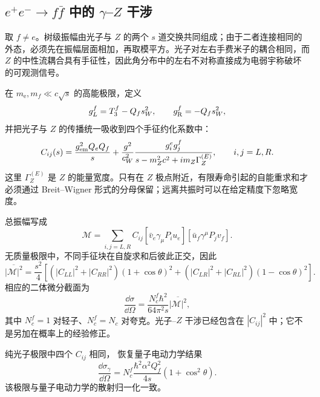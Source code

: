 


\subsection{$e^+e^-\to f\bar f$ 中的 $\gamma$--$Z$ 干涉}

取 $f\neq e$。树级振幅由光子与 $Z$ 的两个 $s$ 道交换共同组成；由于二者连接相同的外态，必须先在振幅层面相加，再取模平方。光子对左右手费米子的耦合相同，而 $Z$ 的中性流耦合具有手征性，因此角分布中的左右不对称直接成为电弱宇称破坏的可观测信号。

在 $m_{\mathrm e},m_f\ll c\sqrt s$ 的高能极限，定义
\begin{equation*}
g_L^f=T_3^f-Q_fs_W^2,
\qquad
g_{\rm R}^f=-Q_fs_W^2,
\end{equation*}
并把光子与 $Z$ 的传播统一吸收到四个手征约化系数中：
\begin{equation}
{
C_{ij}(s)
=\frac{g_{\rm em}^2Q_eQ_f}{s}
+\frac{g^2}{c_W^2}\frac{g_i^eg_j^f}
{s-m_Z^2c^2+i m_Z\Gamma_Z^{(E)}},
\qquad i,j=L,R.}
\label{eq:eeff-chiral-coeff-dp11}
\end{equation}
这里 $\Gamma_Z^{(E)}$ 是 $Z$ 的能量宽度。只有在 $Z$ 极点附近，有限寿命引起的自能重求和才必须通过 Breit--Wigner 形式的分母保留；远离共振时可以在给定精度下忽略宽度。

总振幅写成
\begin{equation*}
\mathcal M
=\sum_{i,j=L,R}C_{ij}
[\bar v_e\gamma_\mu P_i u_e]
[\bar u_f\gamma^\mu P_jv_f].
\end{equation*}
无质量极限中，不同手征块在自旋求和后彼此正交，因此
\begin{equation}
{
\overline{|\mathcal M|^2}
=\frac{s^2}{4}\left[
(|C_{LL}|^2+|C_{RR}|^2)(1+\cos\theta)^2
+(|C_{LR}|^2+|C_{RL}|^2)(1-\cos\theta)^2
\right].}
\label{eq:eeff-spin-summed-dp11}
\end{equation}
相应的二体微分截面为
\begin{equation*}
\frac{\dd\sigma}{\dd\Omega}
=\frac{N_c^f\hbar^2}{64\pi^2s}\overline{|\mathcal M|^2},
\end{equation*}
其中 $N_c^f=1$ 对轻子、$N_c^f=N_c$ 对夸克。光子--$Z$ 干涉已经包含在 $|C_{ij}|^2$ 中；它不是另加在概率上的经验修正。

纯光子极限中四个 $C_{ij}$ 相同， 恢复量子电动力学结果
\begin{equation}
{
\frac{\dd\sigma_\gamma}{\dd\Omega}
=N_c^f\frac{\hbar^2\alpha^2Q_f^2}{4s}(1+\cos^2\theta).}
\label{eq:eeff-qed-limit-dp11}
\end{equation}
该极限与量子电动力学的散射归一化一致。

